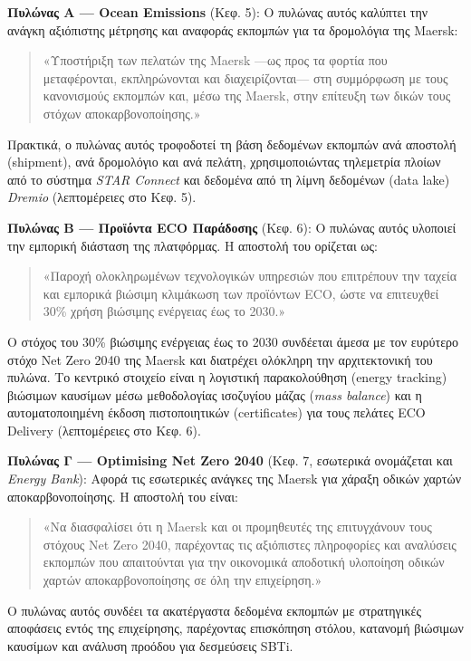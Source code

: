 \documentclass[11pt,a4paper,greek,twoside]{template-xe}
\begin{document}
\textbf{Πυλώνας Α --- Ocean Emissions} (Κεφ. 5): Ο πυλώνας αυτός
καλύπτει την ανάγκη αξιόπιστης μέτρησης και αναφοράς εκπομπών για τα
δρομολόγια της Maersk:

\begin{quote}
«Υποστήριξη των πελατών της Maersk ---ως προς τα φορτία που
μεταφέρονται, εκπληρώνονται και διαχειρίζονται--- στη συμμόρφωση με τους
κανονισμούς εκπομπών και, μέσω της Maersk, στην επίτευξη των δικών τους
στόχων αποκαρβονοποίησης.»
\end{quote}

Πρακτικά, ο πυλώνας αυτός τροφοδοτεί τη βάση δεδομένων εκπομπών ανά
αποστολή (shipment), ανά δρομολόγιο και ανά πελάτη, χρησιμοποιώντας
τηλεμετρία πλοίων από το σύστημα \emph{STAR Connect} και δεδομένα από τη
λίμνη δεδομένων (data lake) \emph{Dremio} (λεπτομέρειες στο Κεφ. 5).

\textbf{Πυλώνας Β --- Προϊόντα ECO Παράδοσης} (Κεφ. 6): Ο πυλώνας αυτός
υλοποιεί την εμπορική διάσταση της πλατφόρμας. Η αποστολή του ορίζεται
ως:

\begin{quote}
«Παροχή ολοκληρωμένων τεχνολογικών υπηρεσιών που επιτρέπουν την ταχεία
και εμπορικά βιώσιμη κλιμάκωση των προϊόντων ECO, ώστε να επιτευχθεί
30\% χρήση βιώσιμης ενέργειας έως το 2030.»
\end{quote}

Ο στόχος του 30\% βιώσιμης ενέργειας έως το 2030 συνδέεται άμεσα με τον
ευρύτερο στόχο Net Zero 2040 της Maersk και διατρέχει ολόκληρη την
αρχιτεκτονική του πυλώνα. Το κεντρικό στοιχείο είναι η λογιστική
παρακολούθηση (energy tracking) βιώσιμων καυσίμων μέσω μεθοδολογίας
ισοζυγίου μάζας (\emph{mass balance}) και η αυτοματοποιημένη έκδοση
πιστοποιητικών (certificates) για τους πελάτες ECO Delivery
(λεπτομέρειες στο Κεφ. 6).

\textbf{Πυλώνας Γ --- Optimising Net Zero 2040} (Κεφ. 7, εσωτερικά
ονομάζεται και \emph{Energy Bank}): Αφορά τις εσωτερικές ανάγκες της
Maersk για χάραξη οδικών χαρτών αποκαρβονοποίησης. Η αποστολή του είναι:

\begin{quote}
«Να διασφαλίσει ότι η Maersk και οι προμηθευτές της επιτυγχάνουν τους
στόχους Net Zero 2040, παρέχοντας τις αξιόπιστες πληροφορίες και
αναλύσεις εκπομπών που απαιτούνται για την οικονομικά αποδοτική
υλοποίηση οδικών χαρτών αποκαρβονοποίησης σε όλη την επιχείρηση.»
\end{quote}

Ο πυλώνας αυτός συνδέει τα ακατέργαστα δεδομένα εκπομπών με στρατηγικές
αποφάσεις εντός της επιχείρησης, παρέχοντας επισκόπηση στόλου, κατανομή
βιώσιμων καυσίμων και ανάλυση προόδου για δεσμεύσεις SBTi.
\end{document}
